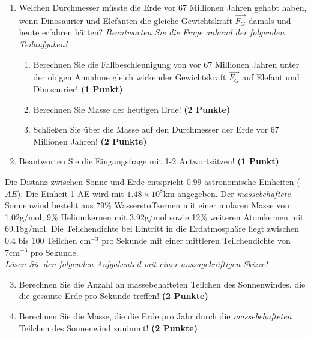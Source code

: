 \documentclass[a4paper, 9pt]{scrartcl}\usepackage[]{graphicx}\usepackage[]{xcolor}
\begin{document}
\begin{enumerate}
\item Welchen Durchmesser müsste die Erde vor 67 Millionen Jahren gehabt haben, wenn Dinosaurier und Elefanten die gleiche Gewichtskraft $\overrightarrow{F_G}$ damals und heute erfahren hätten? \textit{Beantworten Sie die Frage anhand der folgenden Teilaufgaben!}
\begin{enumerate}
\item Berechnen Sie die Fallbeschleunigung von vor 67 Millionen Jahren unter der obigen Annahme gleich wirkender Gewichtskraft $\overrightarrow{F_G}$ auf Elefant und Dinosaurier! \textbf{(1 Punkt)}
\item Berechnen Sie Masse der heutigen Erde! \textbf{(2 Punkte)}
\item Schließen Sie über die Masse auf den Durchmesser der Erde vor 67 Millionen Jahren! \textbf{(2 Punkte)}
\end{enumerate}
\item Beantworten Sie die Eingangsfrage mit 1-2 Antwortsätzen! \textbf{(1 Punkt)}
\end{enumerate}

Die Distanz zwischen Sonne und Erde entspricht 0.99 astronomische Einheiten ($AE$). Die Einheit 1 AE wird mit \ensuremath{1.48\times 10^{8}}km angegeben. Der \textit{massebehaftete} Sonnenwind besteht aus 79\% Wasserstoffkernen mit einer molaren Masse von 1.02g/mol, 9\% Heliumkernen mit 3.92g/mol sowie 12\% weiteren Atomkernen mit  69.18g/mol. Die Teilchendichte bei Eintritt in die Erdatmosphäre liegt zwischen 0.4 bis 100 Teilchen cm$^{-3}$ pro Sekunde mit einer mittleren Teilchendichte von 7cm$^{-3}$ pro Sekunde. \\

\textit{Lösen Sie den folgenden Aufgabenteil mit einer aussagekräftigen Skizze!}

\begin{enumerate}
  \setcounter{enumi}{2}
\item Berechnen Sie die Anzahl an massebehafteten Teilchen des Sonnenwindes, die die gesamte Erde pro Sekunde treffen! \textbf{(2 Punkte)}
\item Berechnen Sie die Masse, die die Erde pro Jahr durch die \textit{massebehafteten} Teilchen des Sonnenwind zunimmt! \textbf{(2 Punkte)}
\end{enumerate}
\end{document}
